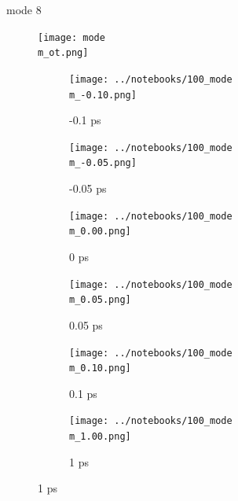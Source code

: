 \documentclass{beamer}
\begin{document}
\renewcommand\m{8}
\begin{frame}{mode \m}
	\vspace{\vh mm}
\begin{figure}
	\centering
	\texttt{[image: mode\\m\_ot.png]}
\end{figure}
	\begin{figure}
		\centering
		\begin{subfigure}[b]{\w\textwidth}
			\centering
			\texttt{[image: ../notebooks/100\_mode\\m\_-0.10.png]}
			\caption{-0.1 ps}
		\end{subfigure}
		\begin{subfigure}[b]{\w\textwidth}
			\centering
			\texttt{[image: ../notebooks/100\_mode\\m\_-0.05.png]}
			\caption{-0.05 ps}
		\end{subfigure}
		\begin{subfigure}[b]{\w\textwidth}
			\centering
			\texttt{[image: ../notebooks/100\_mode\\m\_0.00.png]}
			\caption{0 ps}
		\end{subfigure}
		\begin{subfigure}[b]{\w\textwidth}
			\centering
			\texttt{[image: ../notebooks/100\_mode\\m\_0.05.png]}
			\caption{0.05 ps}
		\end{subfigure}
		\begin{subfigure}[b]{\w\textwidth}
			\centering
			\texttt{[image: ../notebooks/100\_mode\\m\_0.10.png]}
			\caption{0.1 ps}
		\end{subfigure}
		\begin{subfigure}[b]{\w\textwidth}
			\centering
			\texttt{[image: ../notebooks/100\_mode\\m\_1.00.png]}
			\caption{1 ps}
		\end{subfigure}
	\end{figure}
\end{frame}
\end{document}
